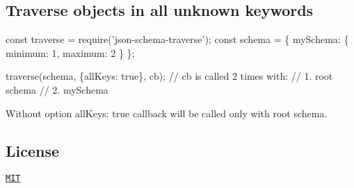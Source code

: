 \subsection*{Traverse objects in all unknown keywords}


\begin{DoxyCode}
const traverse = require('json-schema-traverse');
const schema = \{
  mySchema: \{
    minimum: 1,
    maximum: 2
  \}
\};

traverse(schema, \{allKeys: true\}, cb);
// cb is called 2 times with:
// 1. root schema
// 2. mySchema
\end{DoxyCode}


Without option {\ttfamily all\+Keys\+: true} callback will be called only with root schema.

\subsection*{License}

\href{https://github.com/epoberezkin/json-schema-traverse/blob/master/LICENSE}{\tt M\+IT} 